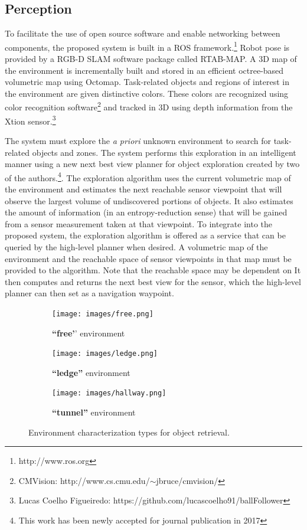 \documentclass[conference]{IEEEtran}
\begin{document}
\subsection{Perception}
\label{sec:perception}
%
To facilitate the use of open source software and enable networking between components, the proposed system is built in a ROS framework.\footnote{http://www.ros.org} Robot pose is provided by a RGB-D SLAM software package called RTAB-MAP\cite{rtabmap}. A 3D map of the environment is incrementally built and stored in an efficient octree-based volumetric map using Octomap\cite{octomap}.  Task-related objects and regions of interest in the environment are given distinctive colors. These colors are recognized using color recognition software\footnote{CMVision: http://www.cs.cmu.edu/$\sim$jbruce/cmvision/} and tracked in 3D using depth information from the Xtion sensor.\footnote{Lucas Coelho Figueiredo: https://github.com/lucascoelho91/ballFollower}

The system must explore the \textit{a priori} unknown environment to search for task-related objects and zones. The system performs this exploration in an intelligent manner using a new next best view planner for object exploration created by two of the authors.\footnote{This work has been newly accepted for journal publication in 2017}. The exploration algorithm uses the current volumetric map of the environment and estimates the next reachable sensor viewpoint that will observe the largest volume of undiscovered portions of objects. It also estimates the amount of information (in an entropy-reduction sense) that will be gained from a sensor measurement taken at that viewpoint. To integrate into the proposed system, the exploration algorithm is offered as a service that can be queried by the high-level planner when desired. A volumetric map of the environment and the reachable space of sensor viewpoints in that map must be provided to the algorithm. Note that the reachable space may be dependent on It then computes and returns the next best view for the sensor, which the high-level planner can then set as a navigation waypoint.

\begin{figure}[t]
      \centering
      \begin{subfigure}[t]{0.15\textwidth}
        \texttt{[image: images/free.png]}
        \caption{\textbf{``free'}' environment}
    \end{subfigure}
    \begin{subfigure}[t]{0.15\textwidth}
        \texttt{[image: images/ledge.png]}
        \caption{\textbf{``ledge''} environment}
    \end{subfigure}
        \begin{subfigure}[t]{0.15\textwidth}
        \texttt{[image: images/hallway.png]}
        \caption{\textbf{``tunnel''} environment}
    \end{subfigure}
      \caption{Environment characterization types for object retrieval.}
      \label{fig:characters}
   \end{figure}
\end{document}
